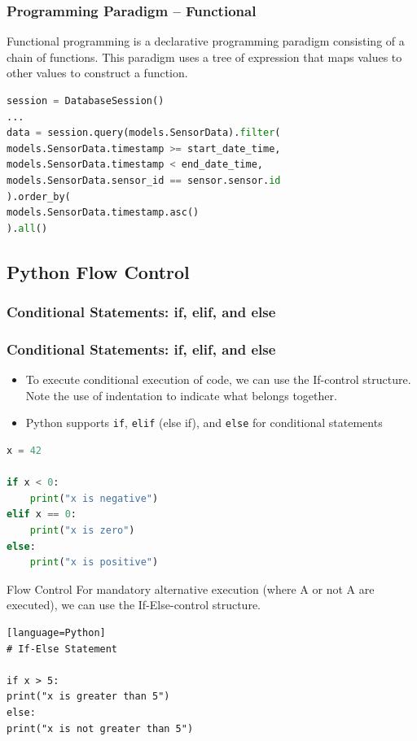 \documentclass{beamer}
\begin{document}
    \begin{frame}[fragile]
        \frametitle{Programming Paradigm -- Functional}
        Functional programming is a declarative programming paradigm consisting of a chain of functions. This paradigm uses a tree of expression that maps values to other values to construct a function.
        \begin{example}
            \begin{lstlisting}[language=Python]
session = DatabaseSession()
...
data = session.query(models.SensorData).filter(
models.SensorData.timestamp >= start_date_time,
models.SensorData.timestamp < end_date_time,
models.SensorData.sensor_id == sensor.sensor.id
).order_by(
models.SensorData.timestamp.asc()
).all()
            \end{lstlisting}
        \end{example}
    \end{frame}

    \subsection{Python Flow Control}
    \subsubsection{Conditional Statements: if, elif, and else}
    \begin{frame}[fragile]
        \frametitle{Conditional Statements: if, elif, and else}
        \begin{itemize}
            \item To execute conditional execution of code, we can use the If-control structure. Note the use of indentation to indicate what belongs together.
            \item Python supports \texttt{if}, \texttt{elif} (else if), and \texttt{else} for conditional statements
        \end{itemize}
        \begin{lstlisting}[language=Python]
x = 42

if x < 0:
    print("x is negative")
elif x == 0:
    print("x is zero")
else:
    print("x is positive")
        \end{lstlisting}
    \end{frame}

    \begin{frame}[fragile]{Flow Control}
        For mandatory alternative execution (where A or not A are executed), we can use the If-Else-control structure.
        \begin{lstlisting}[caption=Python Control Structures][language=Python]
# If-Else Statement

if x > 5:
print("x is greater than 5")
else:
print("x is not greater than 5")
        \end{lstlisting}
    \end{frame}
\end{document}
